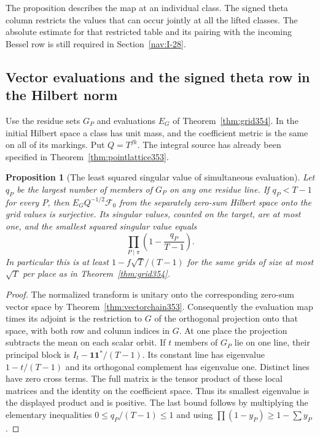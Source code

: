 \documentclass[a4paper,11pt]{article}
\newtheorem{proposition}{Proposition}[section]
\theoremstyle{definition}
\theoremstyle{remark}
\numberwithin{equation}{section}
\begin{document}
The proposition describes the map at an individual class. The
signed theta column restricts the values that can occur jointly
at all the lifted classes. The absolute estimate for that
restricted table and its pairing with the incoming Bessel row
is still required in Section~\ref{nav:I-28}.


\subsection{Vector evaluations and the signed theta row in the Hilbert norm}
\label{sec:rankone354}

Use the residue sets \(G_P\) and evaluations \(E_G\) of
Theorem~\ref{thm:grid354}. In the initial Hilbert space a class
has unit mass, and the coefficient metric is the same on all
of its markings. Put \(Q=T^{fk}\). The integral source has
already been specified in Theorem~\ref{thm:pointlattice353}.

\begin{proposition}[The least squared singular value of simultaneous evaluation]\leavevmode
\label{prop:gridnorm354}
Let \(q_P\) be the largest number of members of \(G_P\) on
any one residue line. If \(q_P<T-1\) for every \(P\), then
\(E_G Q^{-1/2}\mathcal F_0\) from the separately zero-sum
Hilbert space onto the grid values is surjective. Its singular
values, counted on the target, are at most one, and the
smallest squared singular value equals
\[
             \prod_{P\mid\pi}\left(1-\frac{q_P}{T-1}\right).
\]
In particular this is at least \(1-f\sqrt T/(T-1)\)
for the same grids of size at most \(\sqrt T\) per place
as in Theorem~\ref{thm:grid354}.
\end{proposition}
\begin{proof}
The normalized transform is unitary onto the corresponding
zero-sum vector space by Theorem~\ref{thm:vectorchain353}.
Consequently the evaluation map times its adjoint is the
restriction to \(G\) of the orthogonal projection onto that
space, with both row and column indices in \(G\). At one place
the projection subtracts the mean on each scalar orbit.
If \(t\) members of \(G_P\) lie on one line, their principal
block is \(I_t-\mathbf1\mathbf1^*/(T-1)\). Its constant
line has eigenvalue \(1-t/(T-1)\) and its orthogonal
complement has eigenvalue one. Distinct lines have zero
cross terms. The full matrix is the tensor product of these
local matrices and the identity on the coefficient space.
Thus its smallest eigenvalue is the displayed product and
is positive. The last bound follows by multiplying the
elementary inequalities \(0\le q_P/(T-1)\le1\) and using
\(\prod(1-y_P)\ge1-\sum y_P\).
\end{proof}
\end{document}
